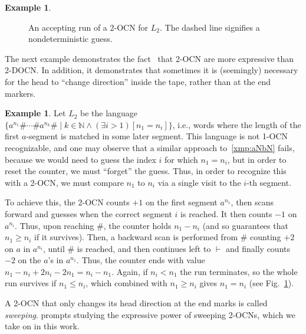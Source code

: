 \documentclass[11pt,a4paper]{amsart}
\theoremstyle{definition}
\newtheorem{example}[theorem]{Example}
\newcommand{\lmark}{\vdash}
\newcommand{\bbN}{\mathbb{N}}
\begin{document}
\begin{example}
\begin{figure}[ht]
\begin{minipage}{.24\textwidth}
				\caption{An accepting run of a 2-OCN for $L_2$. The dashed line signifies a nondeterministic guess. }
				\label{fig:example_2_2}
			\end{minipage}
		\end{figure}
	\end{example}
	The next example demonstrates the fact~\cite{chan1987two} that 2-OCN are more expressive than 2-DOCN. In addition, it demonstrates that sometimes it is (seemingly) necessary for the head to ``change direction'' inside the tape, rather than at the end markers. 
	\begin{example}
		\label{xmp:nondet_aNbN} Let \(L_2\) be the language
		$\{a^{n_1}\#\cdots \#a^{n_k}\#\mid k\in \bbN\wedge (\exists i > 1)[n_1=n_i]\}$, i.e., words where the length of the first $a$-segment is matched in some later segment. This language
		is not 1-OCN recognizable, and one may observe that a similar approach
		to~\cref{xmp:aNbN} fails, because we would need to guess the index $i$ for
		which $n_1=n_i$, but in order to reset the counter, we must ``forget'' the
		guess. Thus, in order to recognize this with a 2-OCN, we must compare $n_1$
		to $n_i$ via a single visit to the $i$-th segment.
		
		To achieve this, the 2-OCN counts $+1$ on
		the first segment $a^{n_1}$, then scans forward and guesses when the
		correct segment $i$ is reached. It then counts $-1$ on $a^{n_i}$. Thus,
		upon reaching $\#$, the counter holds $n_1-n_i$ (and so guarantees that
		$n_1\ge n_i$ if it survives).  Then, a backward scan is performed from $\#$
		counting $+2$ on $a$ in $a^{n_i}$, until $\#$ is reached, and then
		continues left to $\lmark$ and finally counts $-2$ on the $a$'s in
		$a^{n_1}$.  Thus, the counter ends with value
		$n_1-n_i+2n_i-2n_1=n_i-n_1$. Again, if $n_i<n_1$ the run terminates, so the
		whole run survives if $n_1\le n_i$, which combined with $n_1\ge n_i$ gives $n_1=n_i$ (see Fig.~\ref{fig:example_2_2}).
	\end{example}
	A 2-OCN that only changes its head direction at the end marks is called
	\emph{sweeping}.  prompts studying the expressive power of
	sweeping 2-OCNs, which we take on in this work.
	
\end{document}
